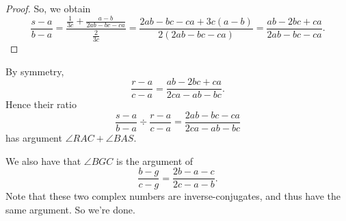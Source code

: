\begin{proof}
So, we obtain
\[
  \frac{s-a}{b-a}
  = \frac{\frac{1}{3c}+\frac{a-b}{2ab-bc-ca}}{\frac{2}{3c}}
  = \frac{2ab-bc-ca+3c(a-b)}{2(2ab-bc-ca)}=\frac{ab-2bc+ca}{2ab-bc-ca}.
\]
\end{proof}

By symmetry,
\[ \frac{r-a}{c-a}=\frac{ab-2bc+ca}{2ca-ab-bc}. \]
Hence their ratio
\[ \frac{s-a}{b-a} \div \frac{r-a}{c-a} = \frac{2ab-bc-ca}{2ca-ab-bc} \]
has argument $\angle RAC +\angle BAS$.

We also have that $\angle BGC$ is the argument of
\[ \frac{b-g}{c-g}=\frac{2b-a-c}{2c-a-b}. \]
Note that these two complex numbers are inverse-conjugates,
and thus have the same argument. So we're done.
